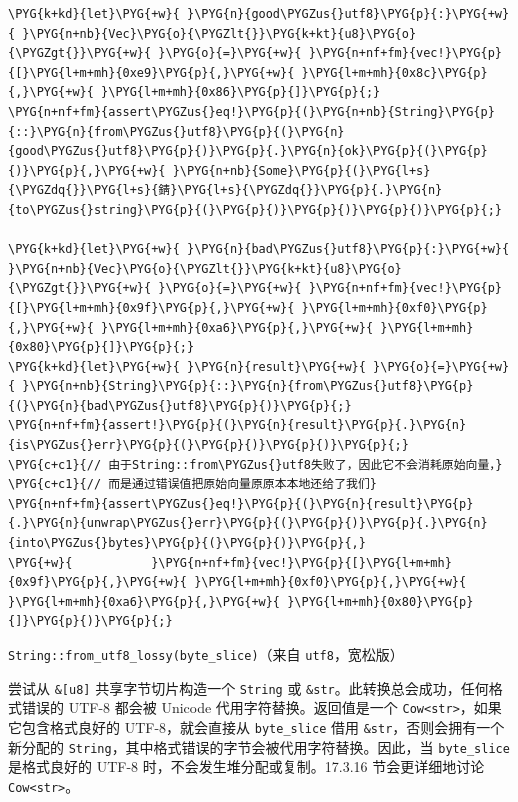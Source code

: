 \begin{Verbatim}[commandchars=\\\{\},breaklines=true,breakanywhere=true,fontsize=\codefont,xleftmargin=17bp]
\PYG{k+kd}{let}\PYG{+w}{ }\PYG{n}{good\PYGZus{}utf8}\PYG{p}{:}\PYG{+w}{ }\PYG{n+nb}{Vec}\PYG{o}{\PYGZlt{}}\PYG{k+kt}{u8}\PYG{o}{\PYGZgt{}}\PYG{+w}{ }\PYG{o}{=}\PYG{+w}{ }\PYG{n+nf+fm}{vec!}\PYG{p}{[}\PYG{l+m+mh}{0xe9}\PYG{p}{,}\PYG{+w}{ }\PYG{l+m+mh}{0x8c}\PYG{p}{,}\PYG{+w}{ }\PYG{l+m+mh}{0x86}\PYG{p}{]}\PYG{p}{;}
\PYG{n+nf+fm}{assert\PYGZus{}eq!}\PYG{p}{(}\PYG{n+nb}{String}\PYG{p}{::}\PYG{n}{from\PYGZus{}utf8}\PYG{p}{(}\PYG{n}{good\PYGZus{}utf8}\PYG{p}{)}\PYG{p}{.}\PYG{n}{ok}\PYG{p}{(}\PYG{p}{)}\PYG{p}{,}\PYG{+w}{ }\PYG{n+nb}{Some}\PYG{p}{(}\PYG{l+s}{\PYGZdq{}}\PYG{l+s}{錆}\PYG{l+s}{\PYGZdq{}}\PYG{p}{.}\PYG{n}{to\PYGZus{}string}\PYG{p}{(}\PYG{p}{)}\PYG{p}{)}\PYG{p}{)}\PYG{p}{;}

\PYG{k+kd}{let}\PYG{+w}{ }\PYG{n}{bad\PYGZus{}utf8}\PYG{p}{:}\PYG{+w}{ }\PYG{n+nb}{Vec}\PYG{o}{\PYGZlt{}}\PYG{k+kt}{u8}\PYG{o}{\PYGZgt{}}\PYG{+w}{ }\PYG{o}{=}\PYG{+w}{ }\PYG{n+nf+fm}{vec!}\PYG{p}{[}\PYG{l+m+mh}{0x9f}\PYG{p}{,}\PYG{+w}{ }\PYG{l+m+mh}{0xf0}\PYG{p}{,}\PYG{+w}{ }\PYG{l+m+mh}{0xa6}\PYG{p}{,}\PYG{+w}{ }\PYG{l+m+mh}{0x80}\PYG{p}{]}\PYG{p}{;}
\PYG{k+kd}{let}\PYG{+w}{ }\PYG{n}{result}\PYG{+w}{ }\PYG{o}{=}\PYG{+w}{ }\PYG{n+nb}{String}\PYG{p}{::}\PYG{n}{from\PYGZus{}utf8}\PYG{p}{(}\PYG{n}{bad\PYGZus{}utf8}\PYG{p}{)}\PYG{p}{;}
\PYG{n+nf+fm}{assert!}\PYG{p}{(}\PYG{n}{result}\PYG{p}{.}\PYG{n}{is\PYGZus{}err}\PYG{p}{(}\PYG{p}{)}\PYG{p}{)}\PYG{p}{;}
\PYG{c+c1}{// 由于String::from\PYGZus{}utf8失败了，因此它不会消耗原始向量，}
\PYG{c+c1}{// 而是通过错误值把原始向量原原本本地还给了我们}
\PYG{n+nf+fm}{assert\PYGZus{}eq!}\PYG{p}{(}\PYG{n}{result}\PYG{p}{.}\PYG{n}{unwrap\PYGZus{}err}\PYG{p}{(}\PYG{p}{)}\PYG{p}{.}\PYG{n}{into\PYGZus{}bytes}\PYG{p}{(}\PYG{p}{)}\PYG{p}{,}
\PYG{+w}{           }\PYG{n+nf+fm}{vec!}\PYG{p}{[}\PYG{l+m+mh}{0x9f}\PYG{p}{,}\PYG{+w}{ }\PYG{l+m+mh}{0xf0}\PYG{p}{,}\PYG{+w}{ }\PYG{l+m+mh}{0xa6}\PYG{p}{,}\PYG{+w}{ }\PYG{l+m+mh}{0x80}\PYG{p}{]}\PYG{p}{)}\PYG{p}{;}
\end{Verbatim}

\begin{myNote}
\texttt{String::from\_utf8\_lossy(byte\_slice)}（来自 \texttt{utf8}，宽松版）
\end{myNote}

尝试从 \texttt{\&[u8]} 共享字节切片构造一个 \texttt{String} 或 \texttt{\&str}。此转换总会成功，任何格式错误的 UTF-8 都会被 Unicode 代用字符替换。返回值是一个 \texttt{Cow<str>}，如果它包含格式良好的 UTF-8，就会直接从 \texttt{byte\_slice} 借用 \texttt{\&str}，否则会拥有一个新分配的 \texttt{String}，其中格式错误的字节会被代用字符替换。因此，当 \texttt{byte\_slice} 是格式良好的 UTF-8 时，不会发生堆分配或复制。17.3.16 节会更详细地讨论 \texttt{Cow<str>}。

